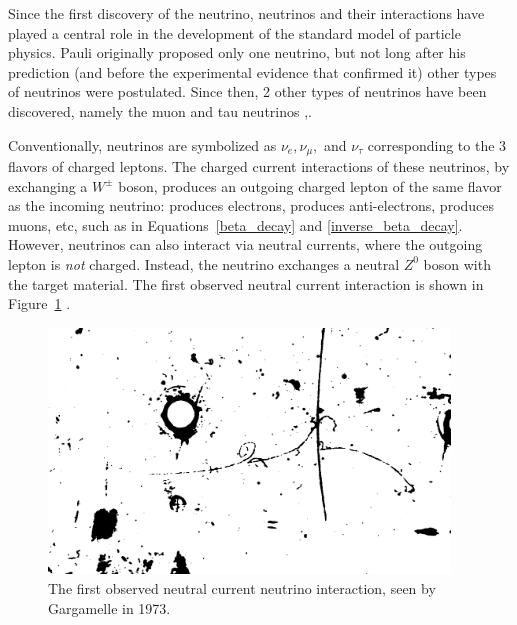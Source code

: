 Since the first discovery of the neutrino, neutrinos and their interactions have played a central role in the development of the standard model of particle physics.  Pauli originally proposed only one neutrino, but not long after his prediction (and before the experimental evidence that confirmed it) other types of neutrinos were postulated.   Since then, 2 other types of neutrinos have been discovered, namely the muon and tau neutrinos \cite{muon_neutrino},\cite{tau_neutrino}. 

Conventionally, neutrinos are symbolized as $\nu_e, \nu_\mu,$ and $\nu_\tau$ corresponding to the 3 flavors of charged leptons.  The charged current interactions of these neutrinos, by exchanging a $W^\pm$ boson, produces an outgoing charged lepton of the same flavor as the incoming neutrino: \nue produces electrons, \nuebar produces anti-electrons, \numu produces muons, etc, such as in Equations~\ref{beta_decay} and \ref{inverse_beta_decay}.  However, neutrinos can also interact via neutral currents, where the outgoing lepton is {\em not} charged.  Instead, the neutrino exchanges a neutral $Z^0$ boson with the target material.  The first observed neutral current interaction is shown in Figure~\ref{fig:gargamelle_nc} \cite{gargamelle_nc}.

\begin{figure}[htbp]
  \centering
  \includegraphics[width=0.95\textwidth]{intro_figures/gargamelle_nc.png}
  \caption[First Observed Neutral Current Neutrino Interaction]{The first observed neutral current neutrino interaction, seen by Gargamelle in 1973.}
  \label{fig:gargamelle_nc}
\end{figure}


